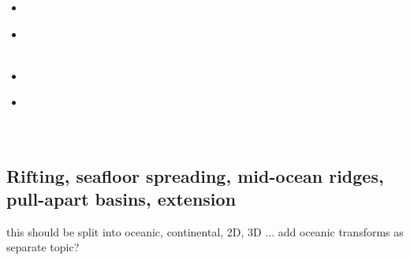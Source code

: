\begin{scriptsize}
\begin{itemize}
\textcite{lepo13} \\ 
\textcite{miam13} \\ 
\textcite{mont13} \\
\item[\twothousandfourteen] 
\textcite{codb14} \\
\item[\twothousandfifteen] 
\textcite{chpe15} \\ 
\textcite{ohkh15} \\
\item[\twothousandseventeen] 
\textcite{bocc17} \\
\item[\twothousandnineteen] 
\textcite{rejv19} \\ 
\textcite{hakt19} \\
\textcite{gocg19} \\
\end{itemize}
\end{scriptsize}

\subsection{Rifting, seafloor spreading, mid-ocean ridges, pull-apart basins, extension}

{\color{red} this should be split into oceanic, continental, 2D, 3D ...}
add oceanic transforms as separate topic?

